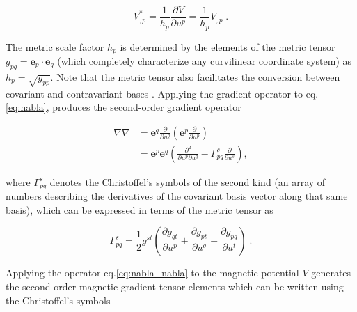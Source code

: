 \documentclass[extra,mreferee]{gji}
\begin{document}
\begin{equation}
V_{,p}^* = \frac{1}{h_p} \frac{\partial V}{\partial u^p } = \frac{1}{h_p} V_{,p} \; .  \label{eq:nabla_v_phys}
\end{equation}

 The metric scale factor $h_p$ is determined by the elements of the metric tensor $g_{pq}=\mathbf{e}_p \cdot \mathbf{e}_q$ (which completely characterize any curvilinear coordinate system) as $h_p=\sqrt{g_{pp}}$. Note that the metric tensor also facilitates the conversion between covariant and contravariant bases \citep{Riley_etal_2004,Casotto_Fantino_2009}.  
Applying the gradient operator to eq.\eqref{eq:nabla}, produces the second-order gradient operator 

\begin{align}
\nabla \nabla &= \mathbf{e}^q \frac{\partial}{\partial u^q} \left( \mathbf{e}^p \frac{\partial}{\partial u^p}  \right) \nonumber  \\
              &= \mathbf{e}^p \mathbf{e}^q \left(\frac{\partial^2}{\partial u^p \partial u^q} - \Gamma_{pq}^s \frac{\partial}{\partial u^s}  \right) , \label{eq:nabla_nabla}
\end{align}

where $\Gamma_{pq}^s$ denotes the Christoffel's symbols of the second kind (an array of numbers describing the derivatives of the covariant basis vector along that same basis), which can be expressed in terms of the metric tensor as \citep[p.~814]{Riley_etal_2004}

\begin{equation}
\Gamma_{pq}^s = \frac{1}{2} g^{st} \left( \frac{\partial g_{qt}}{\partial u^p} + \frac{\partial g_{pt}}{\partial u^q} - \frac{\partial g_{pq}}{\partial u^t} \right) \; . \label{eq:christoffel}
\end{equation}

Applying the operator eq.\eqref{eq:nabla_nabla} to the magnetic potential $V$ generates the second-order magnetic gradient tensor elements  which can be written using the Christoffel's symbols  
\end{document}
